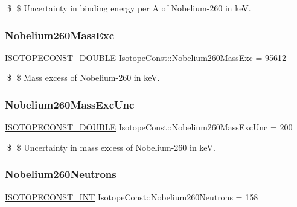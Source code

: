 \$ \$ Uncertainty in binding energy per A of Nobelium-\/260 in keV. \mbox{\label{group___isotope_const-_nobelium-_no260_ga30ab1a59da1000345b42524cdafa7de4}} 
\subsubsection{\texorpdfstring{Nobelium260\+Mass\+Exc}{Nobelium260MassExc}}
{\footnotesize\ttfamily \mbox{\hyperlink{group___isotope_const-_macros_ga8f45a7272ce02c0b4c65c44636ed719a}{I\+S\+O\+T\+O\+P\+E\+C\+O\+N\+S\+T\+\_\+\+D\+O\+U\+B\+LE}} Isotope\+Const\+::\+Nobelium260\+Mass\+Exc = 95612}

\$ \$ Mass excess of Nobelium-\/260 in keV. \mbox{\label{group___isotope_const-_nobelium-_no260_gadd24373d9aa454b304709ff9e3929bc7}} 
\subsubsection{\texorpdfstring{Nobelium260\+Mass\+Exc\+Unc}{Nobelium260MassExcUnc}}
{\footnotesize\ttfamily \mbox{\hyperlink{group___isotope_const-_macros_ga8f45a7272ce02c0b4c65c44636ed719a}{I\+S\+O\+T\+O\+P\+E\+C\+O\+N\+S\+T\+\_\+\+D\+O\+U\+B\+LE}} Isotope\+Const\+::\+Nobelium260\+Mass\+Exc\+Unc = 200}

\$ \$ Uncertainty in mass excess of Nobelium-\/260 in keV. \mbox{\label{group___isotope_const-_nobelium-_no260_ga023c21bdfa313b74de1661be182632a6}} 
\subsubsection{\texorpdfstring{Nobelium260\+Neutrons}{Nobelium260Neutrons}}
{\footnotesize\ttfamily \mbox{\hyperlink{group___isotope_const-_macros_ga5f18360b3e99483a35c32d789e62621c}{I\+S\+O\+T\+O\+P\+E\+C\+O\+N\+S\+T\+\_\+\+I\+NT}} Isotope\+Const\+::\+Nobelium260\+Neutrons = 158}

